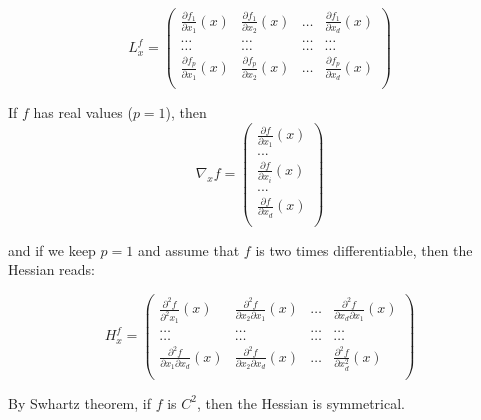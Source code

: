 \documentclass[
10pt, %
a4paper, %
oneside, %
headinclude,footinclude, %
BCOR5mm, %
]{scrartcl}
\begin{document}
\begin{equation*}
L^f_x=
\begin{pmatrix}
    \frac{\partial f_1}{\partial x_1}(x)  & \frac{\partial f_1}{\partial x_2}(x) & \dots & \frac{\partial f_1}{\partial x_d}(x) \\
\dots & \dots & \dots & \dots \\
\dots & \dots & \dots & \dots \\
    \frac{\partial f_p}{\partial x_1}(x)  & \frac{\partial f_p}{\partial x_2}(x) & \dots & \frac{\partial f_p}{\partial x_d}(x) \\
\end{pmatrix}
\end{equation*}

If $f$ has real values ($p=1$), then
\begin{equation*}
    \nabla_xf=
    \begin{pmatrix}
	\frac{\partial f}{\partial x_1} (x)\\
...\\
	\frac{\partial f}{\partial x_i}(x) \\
...\\
	\frac{\partial f}{\partial x_d} (x)\\
\end{pmatrix}
\end{equation*}

and if we keep $p=1$ and assume that $f$ is two times differentiable, then the Hessian reads:

\begin{equation*}
H^f_x=
\begin{pmatrix}
    \frac{\partial^2 f}{\partial^2 x_1}(x)  & \frac{\partial^2 f}{\partial x_2\partial x_1}(x) & \dots & \frac{\partial^2 f}{\partial x_d\partial x_1}(x) \\
\dots & \dots & \dots & \dots \\
\dots & \dots & \dots & \dots \\
    \frac{\partial^2 f}{\partial x_1\partial x_d}(x)  & \frac{\partial^2 f}{\partial x_2\partial x_d}(x) & \dots & \frac{\partial^2 f}{\partial x_d^2}(x) \\
\end{pmatrix}
\end{equation*}

\begin{remark}
    By Swhartz theorem, if $f$ is $C^2$, then the Hessian is symmetrical.
\end{remark}
\end{document}
